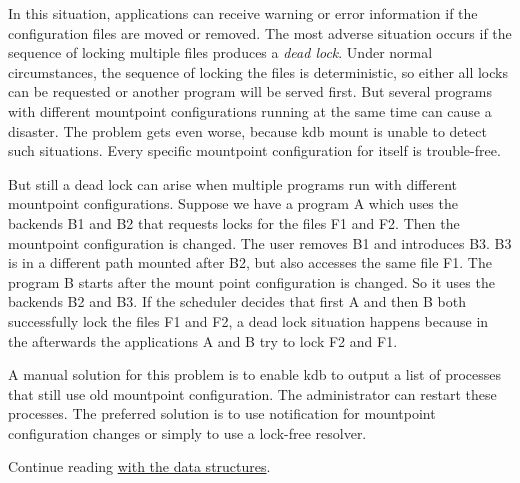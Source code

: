 In this situation, applications can receive warning or error information if the configuration files are moved or removed. The most adverse situation occurs if the sequence of locking multiple files produces a {\itshape dead lock}. Under normal circumstances, the sequence of locking the files is deterministic, so either all locks can be requested or another program will be served first. But several programs with different mountpoint configurations running at the same time can cause a disaster. The problem gets even worse, because {\ttfamily kdb mount} is unable to detect such situations. Every specific mountpoint configuration for itself is trouble-\/free.

But still a dead lock can arise when multiple programs run with different mountpoint configurations. Suppose we have a program {\ttfamily A} which uses the backends {\ttfamily B1} and {\ttfamily B2} that requests locks for the files {\ttfamily F1} and {\ttfamily F2}. Then the mountpoint configuration is changed. The user removes {\ttfamily B1} and introduces {\ttfamily B3}. {\ttfamily B3} is in a different path mounted after {\ttfamily B2}, but also accesses the same file {\ttfamily F1}. The program {\ttfamily B} starts after the mount point configuration is changed. So it uses the backends {\ttfamily B2} and {\ttfamily B3}. If the scheduler decides that first {\ttfamily A} and then {\ttfamily B} both successfully lock the files {\ttfamily F1} and {\ttfamily F2}, a dead lock situation happens because in the afterwards the applications {\ttfamily A} and {\ttfamily B} try to lock {\ttfamily F2} and {\ttfamily F1}.

A manual solution for this problem is to enable {\ttfamily kdb} to output a list of processes that still use old mountpoint configuration. The administrator can restart these processes. The preferred solution is to use notification for mountpoint configuration changes or simply to use a lock-\/free resolver.

Continue reading \hyperlink{md_doc_help_elektra-data-structures_doc_help_elektra-data-structures_md}{with the data structures}. 